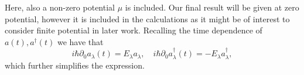 Here, also a non-zero potential $\mu $ is included.
Our final result will be given at zero potential, however it is included in the calculations as it might be of interest to consider finite potential in later work.
Recalling the time dependence of $a(t), a^{\dagger}(t)$ we have that
\[
  i\hbar \partial _0 a_{\lambda }(t) = E_{\lambda }a_{\lambda },
  \quad
  i\hbar \partial _0 a^{\dagger}_{\lambda }(t) = -E_{\lambda }a^{\dagger}_{\lambda },
\]
which further simplifies the expression.

\begin{comment}
  The stress-energy tensor of the massless QED
  \begin{equation}
    \label{eq:64}
    \mathcal{L} = -\frac{1}{4} F^{\mu \nu }F_{\mu \nu } + \overline{\psi} i \slashed{D} \psi
  \end{equation}
  is given by~\cite{chernodubGenerationNernstCurrent2018}
  \begin{equation}
    T^{\mu \nu } = -F^{\mu \nu } F_{\mu \nu } + \frac{1}{4} \eta ^{\mu \nu } F_{\alpha \beta } F^{\alpha \beta } + \frac{i}{2} \overline{\psi}
    \left( \gamma ^{\mu } D^{\nu } + \gamma ^{\nu } D^{\mu } \right) \psi
    - \eta ^{\mu \nu } \overline{\psi} i \slashed{D} \psi .
  \end{equation}
  Specializing to the Weyl Hamiltonian we may drop the terms originating with the $F$ field self energy, and also we will consider only one Weyl spinor part of the Dirac four spinor.
  Thus, the stress-energy tensor is given by
  \begin{equation}
    T^{\mu \nu } = \frac{i}{2} \psi ^{\dagger} \left( \sigma ^{\mu } D^{\nu } + \sigma ^{\nu } D^{\mu } \right) \psi  - \eta ^{\mu \nu } \psi ^{\dagger} i \sigma ^{\mu } D_{\mu } \psi ,
    \label{eq:65}
  \end{equation}
  where $\psi $ is to be understood as the solutions found above, $D_{\mu }=\partial _{\mu }  - i e A_{\mu }$ is the covariant derivative, and $\sigma ^{\mu } = (I, \sigma ^i)$
  In our calculations we will require the $T^{0y}$ component, which we will now find.


\end{comment}
